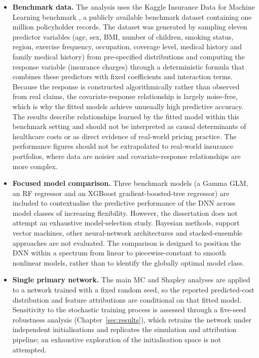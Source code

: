 \begin{itemize}
    \item \textbf{Benchmark data.}  The analysis uses the Kaggle
          Insurance Data for Machine Learning benchmark
          \citep{kaggleInsuranceDataML}, a publicly
          available benchmark dataset containing one million policyholder
          records.  The dataset was generated by sampling eleven
          predictor variables (age, sex, BMI, number of children,
          smoking status, region, exercise frequency, occupation,
          coverage level, medical history and family medical history)
          from pre-specified distributions and computing the response
          variable (insurance charges) through a deterministic formula
          that combines these predictors with fixed coefficients and
          interaction terms.  Because the response is constructed
          algorithmically rather than observed from real claims, the
          covariate-response relationship is largely noise-free, which
          is why the fitted models achieve unusually high predictive
          accuracy.  The results describe relationships learned by the
          fitted model within this benchmark setting and should not be
          interpreted as causal determinants of healthcare costs or as
          direct evidence of real-world pricing practice.  The
          performance figures should not be extrapolated to real-world
          insurance portfolios, where data are noisier and
          covariate-response relationships are more complex.

    \item \textbf{Focused model comparison.}  Three benchmark models (a
          Gamma GLM, an RF regressor and an XGBoost
          gradient-boosted-tree regressor) are included to contextualise the predictive performance
          of the DNN across model classes of increasing
          flexibility.  However, the dissertation does not attempt an
          exhaustive model-selection study.  Bayesian methods, support
          vector machines, other neural-network architectures and
          stacked-ensemble approaches are not evaluated.  The comparison
          is designed to position the DNN within a spectrum from linear
          to piecewise-constant to smooth nonlinear models, rather than
          to identify the globally optimal model class.

    \item \textbf{Single primary network.}  The main MC and
          Shapley analyses are applied to a network trained with a fixed
          random seed, so the reported predicted-cost distribution and
          feature attributions are conditional on that fitted model.
          Sensitivity to the stochastic training process is assessed
          through a five-seed robustness analysis
          (Chapter~\ref{sec:results}), which retrains the network under
          independent initialisations and replicates the simulation and
          attribution pipeline; an exhaustive exploration of the
          initialisation space is not attempted.


\end{itemize}
